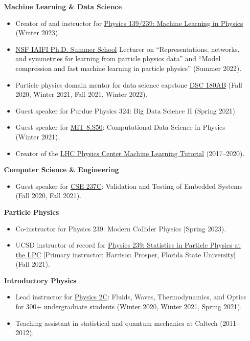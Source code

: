 \documentclass[11pt]{res}
\begin{document}
\begin{resume}
  \textbf{Machine Learning \& Data Science}
  \begin{itemize}
    \itemsep-0.3em
    \item Creator of and instructor for \href{https://jduarte.physics.ucsd.edu/phys139_239}{Physics 139/239: Machine Learning in Physics} ({Winter 2023}).
    \item \href{https://iaifi.org/phd-summer-school.html}{NSF IAIFI Ph.D. Summer School} Lecturer on ``Representations, networks, and symmetries for learning from particle physics data'' and ``Model compression and fast machine learning in particle physics'' (Summer 2022).
    \item Particle physics domain mentor for data science capstone \href{https://jmduarte.github.io/capstone-particle-physics-domain}{DSC 180AB} ({Fall 2020, Winter 2021, Fall 2021, Winter 2022}).
    \item Guest speaker for Purdue Physics 324: Big Data Science II ({Spring 2021})
    \item Guest speaker for \href{https://github.com/violatingcp/MIT_8.S50}{MIT 8.S50}: Computational Data Science in Physics ({Winter 2021}).
    \item Creator of the \href{https://github.com/FNALLPC/machine-learning-hats}{LHC Physics Center Machine Learning Tutorial} ({2017--2020}).
  \end{itemize}

  \textbf{Computer Science \& Engineering}
  \begin{itemize}
    \itemsep-0.3em
    \item Guest speaker for \href{http://kastner.ucsd.edu/ryan/cse237c/}{CSE 237C}: Validation and Testing of Embedded Systems ({Fall 2020, Fall 2021}).
  \end{itemize}

  \textbf{Particle Physics}
  \begin{itemize}
    \itemsep-0.3em
    \item Co-instructor for Physics 239: Modern Collider Physics ({Spring 2023}).
    \item UCSD instructor of record for \href{https://indico.cern.ch/event/1066958/}{Physics 239: Statistics in Particle Physics at the LPC} [Primary instructor: Harrison Prosper, Florida State University] ({Fall 2021}).
  \end{itemize}

  \textbf{Introductory Physics}
  \begin{itemize}
    \itemsep-0.3em
    \item Lead instructor for \href{https://jduarte.physics.ucsd.edu/phys2c/index.html}{Physics 2C}: Fluids, Waves, Thermodynamics, and Optics for 300+ undergraduate students ({Winter 2020, Winter 2021, Spring 2021}).
    \item Teaching assistant in statistical and quantum mechanics at Caltech ({2011--2012}).
  \end{itemize}


\end{resume}
\end{document}
